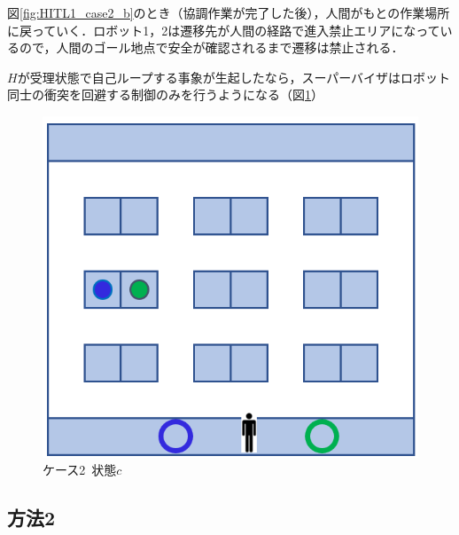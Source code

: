 図\ref{fig:HITL1_case2_b}のとき（協調作業が完了した後），人間がもとの作業場所に戻っていく．ロボット1，2は遷移先が人間の経路で進入禁止エリアになっているので，人間のゴール地点で安全が確認されるまで遷移は禁止される．

$H$が受理状態で自己ループする事象が生起したなら，スーパーバイザはロボット同士の衝突を回避する制御のみを行うようになる（図\ref{fig:HITL2_case2_c}）


\begin{figure}[!t]
    \centering
    \includegraphics[scale=0.33]{figures/HITL1_case2_c.png}
    \caption{ケース2\ 状態$c$}
    \label{fig:HITL2_case2_c}
\end{figure}


\subsection{方法2}

